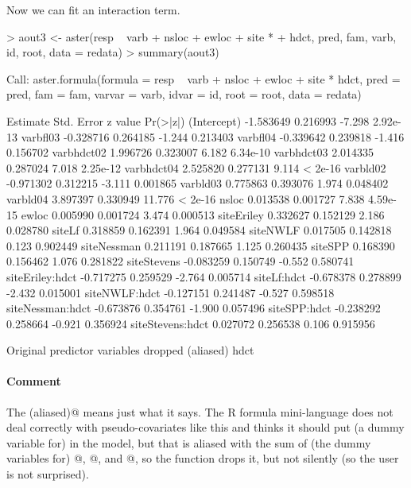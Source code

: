 \documentclass[11pt]{article}
\begin{document}
Now we can fit an interaction term.
\begin{Schunk}
\begin{Sinput}
> aout3 <- aster(resp ~ varb + nsloc + ewloc + site * 
+     hdct, pred, fam, varb, id, root, data = redata)
> summary(aout3)
\end{Sinput}
\begin{Soutput}
Call:
aster.formula(formula = resp ~ varb + nsloc + ewloc + site * 
    hdct, pred = pred, fam = fam, varvar = varb, idvar = id, 
    root = root, data = redata)

                  Estimate Std. Error z value Pr(>|z|)
(Intercept)      -1.583649   0.216993  -7.298 2.92e-13
varbfl03         -0.328716   0.264185  -1.244 0.213403
varbfl04         -0.339642   0.239818  -1.416 0.156702
varbhdct02        1.996726   0.323007   6.182 6.34e-10
varbhdct03        2.014335   0.287024   7.018 2.25e-12
varbhdct04        2.525820   0.277131   9.114  < 2e-16
varbld02         -0.971302   0.312215  -3.111 0.001865
varbld03          0.775863   0.393076   1.974 0.048402
varbld04          3.897397   0.330949  11.776  < 2e-16
nsloc             0.013538   0.001727   7.838 4.59e-15
ewloc             0.005990   0.001724   3.474 0.000513
siteEriley        0.332627   0.152129   2.186 0.028780
siteLf            0.318859   0.162391   1.964 0.049584
siteNWLF          0.017505   0.142818   0.123 0.902449
siteNessman       0.211191   0.187665   1.125 0.260435
siteSPP           0.168390   0.156462   1.076 0.281822
siteStevens      -0.083259   0.150749  -0.552 0.580741
siteEriley:hdct  -0.717275   0.259529  -2.764 0.005714
siteLf:hdct      -0.678378   0.278899  -2.432 0.015001
siteNWLF:hdct    -0.127151   0.241487  -0.527 0.598518
siteNessman:hdct -0.673876   0.354761  -1.900 0.057496
siteSPP:hdct     -0.238292   0.258664  -0.921 0.356924
siteStevens:hdct  0.027072   0.256538   0.106 0.915956

Original predictor variables dropped (aliased)
     hdct 
\end{Soutput}
\end{Schunk}

\paragraph{Comment}  The \verb@dropped (aliased)@ means just what
it says.  The R formula mini-language does not deal correctly with
pseudo-covariates like this and thinks it should put (a dummy variable
for) \verb@hdct@ in the model, but that is aliased with the sum of
(the dummy variables for) @, @,
and @, so the \verb@aster@ function drops it, but
not silently (so the user is not surprised).
\end{document}

